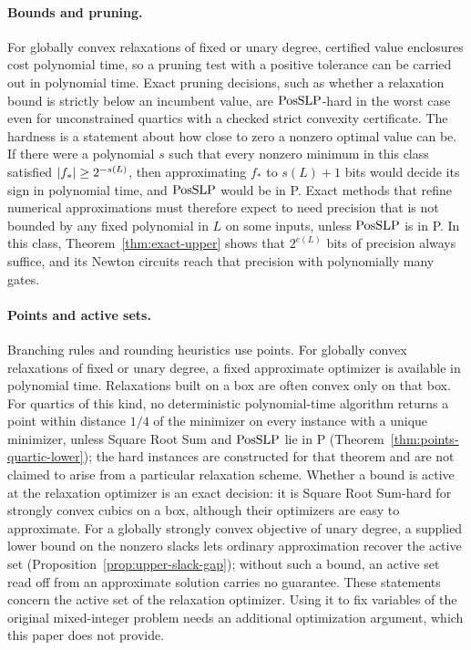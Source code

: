 \paragraph{Bounds and pruning.}
For globally convex relaxations of fixed or unary degree, certified value
enclosures cost polynomial time, so a pruning test with a positive tolerance
can be carried out in polynomial time. Exact pruning
decisions, such as whether a relaxation bound is strictly below an incumbent
value, are $\mathrm{PosSLP}$-hard in the worst case even for unconstrained quartics
with a checked strict convexity certificate. The hardness is a statement about
how close to zero a nonzero optimal value can be. If there were a polynomial
$s$ such that every nonzero minimum in this class satisfied
$\left\lvert f_*\right\rvert\ge2^{-s(L)}$, then approximating $f_*$ to $s(L)+1$ bits would decide
its sign in polynomial time, and $\mathrm{PosSLP}$ would be in P. Exact methods that
refine numerical approximations must therefore expect to need precision that
is not bounded by any fixed polynomial in $L$ on some inputs, unless $\mathrm{PosSLP}$
is in P. In this class, Theorem~\ref{thm:exact-upper} shows that $2^{e(L)}$
bits of precision always suffice, and its Newton circuits reach that
precision with polynomially many gates.

\paragraph{Points and active sets.}
Branching rules and rounding heuristics use points. For globally convex
relaxations of fixed or unary degree, a fixed approximate optimizer is
available in polynomial time. Relaxations built on a box are often convex
only on that box. For quartics of this kind, no deterministic polynomial-time
algorithm returns a point within distance $1/4$ of the minimizer on every
instance with a unique minimizer, unless Square Root Sum and $\mathrm{PosSLP}$ lie in
P (Theorem~\ref{thm:points-quartic-lower}); the hard instances are
constructed for that theorem and are not claimed to arise from a particular
relaxation scheme. Whether a bound is active at the relaxation optimizer is
an exact decision: it is Square Root Sum-hard for strongly convex cubics on a
box, although their optimizers are easy to approximate. For a globally
strongly convex objective of unary degree, a supplied lower bound on the
nonzero slacks lets ordinary approximation recover the active set
(Proposition~\ref{prop:upper-slack-gap}); without such a bound, an active set
read off from an approximate solution carries no guarantee. These
statements concern the active set of the relaxation optimizer. Using it to
fix variables of the original mixed-integer problem needs an additional
optimization argument, which this paper does not provide.

